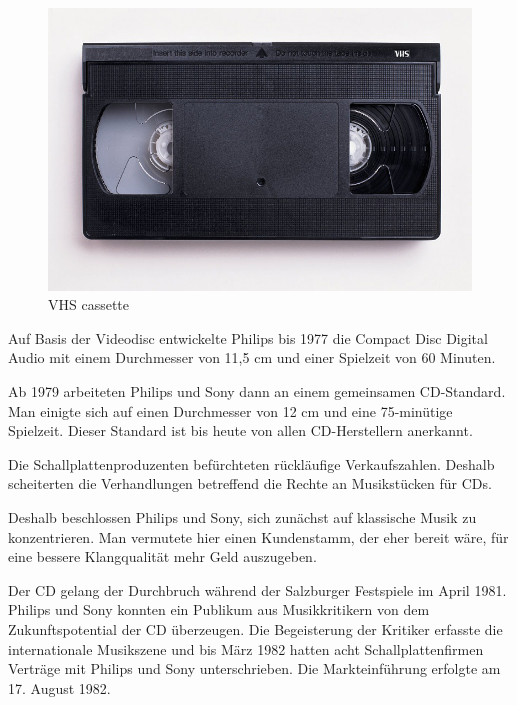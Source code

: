 \begin{figure}[h]
\begin{center}
\begin{minipage}[t]{0.3\textwidth}
\begin{center}
                \includegraphics[height=0.1\textheight]{Bilder/Optische_Datentraeger_Die_Compact_Disc/Geschichte/vhs.png}
                \caption[VHS cassette \newline \url{https://upload.wikimedia.org/wikipedia/commons/6/67/VHS-cassette.jpg}]{VHS cassette}
                \label{fig:vhs}
            \end{center}
        \end{minipage}
    \end{center}
\end{figure}

Auf Basis der Videodisc entwickelte Philips bis 1977 die Compact Disc Digital
Audio mit einem Durchmesser von 11,5 cm und einer Spielzeit von 60 Minuten.

Ab 1979 arbeiteten Philips und Sony dann an einem gemeinsamen CD-Standard. Man
einigte sich auf einen Durchmesser von 12 cm und eine 75-minütige Spielzeit.
Dieser Standard ist bis heute von allen CD-Herstellern anerkannt. \cite{cds}

Die Schallplattenproduzenten befürchteten rückläufige Verkaufszahlen. Deshalb
scheiterten die Verhandlungen betreffend die Rechte an Musikstücken für CDs.

Deshalb beschlossen Philips und Sony, sich zunächst auf klassische Musik zu
konzentrieren. Man vermutete hier einen Kundenstamm, der eher bereit wäre, für
eine bessere Klangqualität mehr Geld auszugeben.

Der CD gelang der Durchbruch während der Salzburger Festspiele im April 1981.
Philips und Sony konnten ein Publikum aus Musikkritikern von dem
Zukunftspotential der CD überzeugen. Die Begeisterung der Kritiker erfasste die
internationale Musikszene und bis März 1982 hatten acht Schallplattenfirmen
Verträge mit Philips und Sony unterschrieben. Die Markteinführung erfolgte am
17. August 1982. \cite{cuz}

